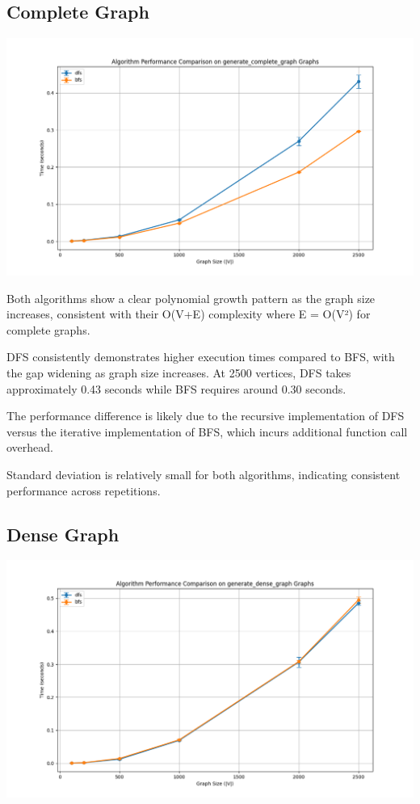 \documentclass[a4paper,12pt]{article}
\begin{document}
\subsection{Complete Graph}
\label{sec:org0b8a883}
\begin{center}
\includegraphics[width=.9\linewidth]{dfs_complete.png}
\label{orgd7dd3c1}
\end{center}
Both algorithms show a clear polynomial growth pattern as the graph size increases, consistent with their O(V+E) complexity where E = O(V²) for complete graphs.

DFS consistently demonstrates higher execution times compared to BFS, with the gap widening as graph size increases. At 2500 vertices, DFS takes approximately 0.43 seconds while BFS requires around 0.30 seconds.

The performance difference is likely due to the recursive implementation of DFS versus the iterative implementation of BFS, which incurs additional function call overhead.

Standard deviation is relatively small for both algorithms, indicating consistent performance across repetitions.
\subsection{Dense Graph}
\label{sec:org010d6ba}
\begin{center}
\includegraphics[width=.9\linewidth]{dfs_dense.png}
\label{org1c44216}
\end{center}
\end{document}
